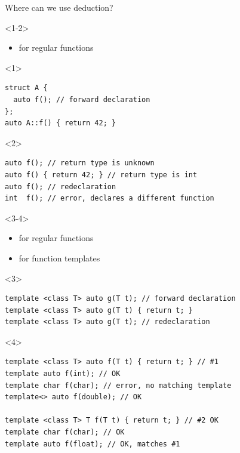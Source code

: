\documentclass[10pt]{beamer}
\begin{document}
\begin{frame}[fragile]{Where can we use deduction?}

	\begin{onlyenv}<1-2>
		\begin{itemize}
			\item \alert{for regular functions}
		\end{itemize}

		\vfill
	\end{onlyenv}

	\begin{onlyenv}
		\begin{verbatim}
struct A {
  auto f(); // forward declaration
};
auto A::f() { return 42; }
\end{verbatim}
	\end{onlyenv}
	\begin{onlyenv}
	\begin{verbatim}
auto f(); // return type is unknown
auto f() { return 42; } // return type is int
auto f(); // redeclaration
int  f(); // error, declares a different function	
	\end{verbatim}

	\end{onlyenv}

	\begin{onlyenv}<3-4>
		\begin{itemize}
			\item for regular functions
			\item \alert{for function templates}
		\end{itemize}

		\vfill
	\end{onlyenv}

	\begin{onlyenv}
		\begin{verbatim}
template <class T> auto g(T t); // forward declaration
template <class T> auto g(T t) { return t; }
template <class T> auto g(T t); // redeclaration
		\end{verbatim}
	\end{onlyenv}

	\begin{onlyenv}
	\begin{verbatim}
template <class T> auto f(T t) { return t; } // #1
template auto f(int); // OK
template char f(char); // error, no matching template
template<> auto f(double); // OK

template <class T> T f(T t) { return t; } // #2 OK
template char f(char); // OK
template auto f(float); // OK, matches #1
	\end{verbatim}
	

\end{onlyenv}
\end{frame}
\end{document}
